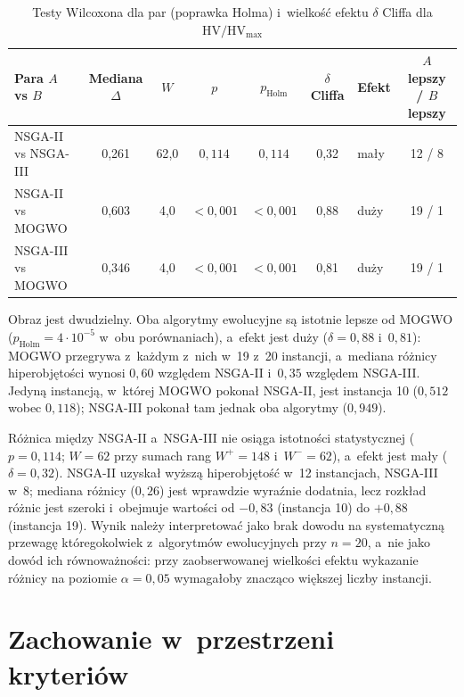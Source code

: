 \begin{table}[htbp]
    \centering
    \caption{Testy Wilcoxona dla par (poprawka Holma) i~wielkość efektu $\delta$ Cliffa dla $\mathrm{HV}/\mathrm{HV}_{\max}$}
    \label{tab:pairwise}
    \begin{tabular}{l c c c c c l c}
        \hline
        Para $A$ vs $B$ & Mediana $\Delta$ & $W$ & $p$ & $p_{\text{Holm}}$ & $\delta$ Cliffa & Efekt & $A$ lepszy / $B$ lepszy \\
        \hline
        NSGA-II vs NSGA-III & 0{,}261 & 62{,}0 & $0{,}114$ & $0{,}114$ & 0{,}32 & mały & 12 / 8 \\
        NSGA-II vs MOGWO & 0{,}603 & 4{,}0 & $< 0{,}001$ & $< 0{,}001$ & 0{,}88 & duży & 19 / 1 \\
        NSGA-III vs MOGWO & 0{,}346 & 4{,}0 & $< 0{,}001$ & $< 0{,}001$ & 0{,}81 & duży & 19 / 1 \\
        \hline
    \end{tabular}
\end{table}

Obraz jest dwudzielny. Oba algorytmy ewolucyjne są istotnie lepsze od MOGWO
($p_{\text{Holm}} = 4 \cdot 10^{-5}$ w~obu porównaniach), a~efekt jest duży
($\delta = 0{,}88$ i~$0{,}81$): MOGWO przegrywa z~każdym z~nich w~19 z~20 instancji,
a~mediana różnicy hiperobjętości wynosi $0{,}60$ względem NSGA-II i~$0{,}35$
względem NSGA-III. Jedyną instancją, w~której MOGWO pokonał NSGA-II, jest
instancja 10 ($0{,}512$ wobec $0{,}118$); NSGA-III pokonał tam jednak oba
algorytmy ($0{,}949$).

Różnica między NSGA-II a~NSGA-III nie osiąga istotności statystycznej
($p = 0{,}114$; $W = 62$ przy sumach rang $W^{+} = 148$ i~$W^{-} = 62$), a~efekt
jest mały ($\delta = 0{,}32$). NSGA-II uzyskał wyższą hiperobjętość w~12
instancjach, NSGA-III w~8; mediana różnicy ($0{,}26$) jest wprawdzie wyraźnie
dodatnia, lecz rozkład różnic jest szeroki i~obejmuje wartości od $-0{,}83$
(instancja 10) do $+0{,}88$ (instancja 19). Wynik należy interpretować jako brak
dowodu na systematyczną przewagę któregokolwiek z~algorytmów ewolucyjnych przy
$n = 20$, a~nie jako dowód ich równoważności: przy zaobserwowanej wielkości efektu
wykazanie różnicy na poziomie $\alpha = 0{,}05$ wymagałoby znacząco większej
liczby instancji.

\section{Zachowanie w~przestrzeni kryteriów}
\label{sec:analiza_kryteria}


